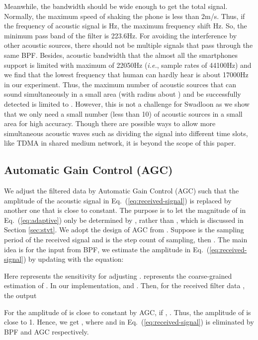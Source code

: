 \documentclass[]{sig-alternate-10pt}
\def\ie{\textit{i.e.}\xspace}
\newcommand{\eqqref}[1]{Eq.~(\ref{#1})}
\def \ourprotocol{Swadloon\xspace}
\begin{document}
Meanwhile, the bandwidth should
be wide enough to get the total signal.  Normally, the maximum speed
of shaking the phone is less than 2m/s.  Thus, if the frequency of
acoustic signal is Hz, the maximum frequency  
shift Hz.  So, the minimum
pass band of the filter is 223.6Hz.  For avoiding the interference by
other acoustic sources, there should not be multiple signals that
pass through the same BPF.  Besides, acoustic bandwidth that the
almost all the smartphones support is limited with maximum of 22050Hz (\ie,
sample rates of 44100Hz) and we find that the lowest frequency that
human can hardly hear is about 17000Hz in our experiment.  Thus, the
maximum number of acoustic sources that can sound simultaneously in
a small area (with radius about ) and be successfully detected
is limited to . However, this is not
a challenge for \ourprotocol as we show that we only need a small
number (less than 10) of acoustic sources in a small area for high
accuracy.  Though there are possible ways to allow more
simultaneous acoustic waves such as dividing the signal into
different time slots, like TDMA in shared medium network, it is beyond the scope of this paper.


\subsection{Automatic Gain Control (AGC)}
We adjust the filtered data by Automatic Gain Control (AGC) such that
the amplitude of the acoustic signal  in \eqqref{eq:received-signal} is replaced by another one that is close to constant.
The purpose is to let the magnitude of  in
\eqqref{eq:adaptive} only be determined by , rather than ,  which is discussed in Section \ref{sec:stvt}.
We adopt the design of AGC from \cite{rice2008digital}.  Suppose  is the sampling period of the received signal and   is the step count of sampling, then . The main
idea is for the  input  from BPF, we estimate the amplitude
 in \eqqref{eq:received-signal} by updating  with
the equation:

Here  represents the sensitivity for adjusting . 
represents the coarse-grained estimation of . In our implementation,
  and .
Then, for the received filter data , the output


For the amplitude of  is close to constant by AGC, if
, . Thus, the amplitude
of  is close to 1.
Hence, we get , where
 and  in \eqqref{eq:received-signal} is eliminated by BPF and AGC respectively.
\end{document}
